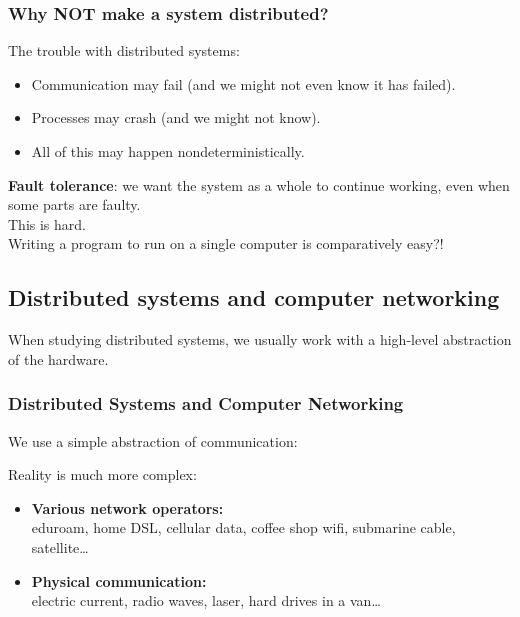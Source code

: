 \begin{frame}
    \label{s:why-not}
    \frametitle{Why NOT make a system distributed?}
    The trouble with distributed systems:
    \begin{itemize}
        \item Communication may fail (and we might not even know it has failed).
        \item Processes may crash (and we might not know).
        \item All of this may happen nondeterministically.
    \end{itemize}\vspace{1em}\pause
    \textbf{Fault tolerance}: we want the system as a whole to continue working, even when some parts are faulty.\\[1em]
    This is hard.\\[1em]
    Writing a program to run on a single computer is comparatively easy?!
\end{frame}


\subsection{Distributed systems and computer networking}

When studying distributed systems, we usually work with a high-level abstraction of the hardware.

\begin{frame}
    \label{s:networking}
    \frametitle{Distributed Systems and Computer Networking}
    We use a simple abstraction of communication:
    \begin{center}
    \end{center}

    Reality is much more complex:
    \begin{itemize}
        \item \textbf{Various network operators:}\\ eduroam, home DSL, cellular data, coffee shop wifi, submarine cable, satellite\dots\\[1em]
        \item \textbf{Physical communication:}\\ electric current, radio waves, laser, hard drives in a van\dots
    \end{itemize}
\end{frame}

